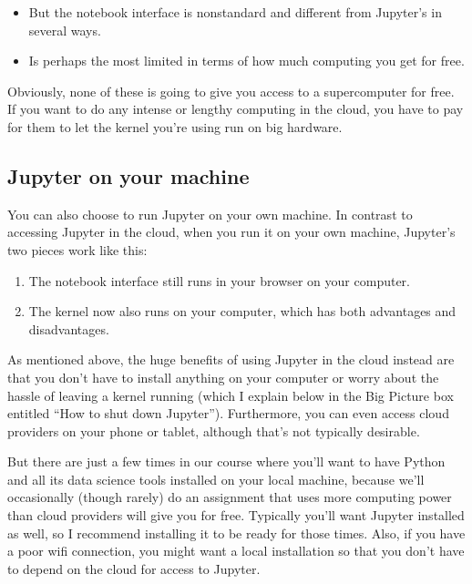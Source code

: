 \documentclass[letterpaper,10pt,english]{jupyterBook}
\begin{document}
\begin{enumerate}
\begin{itemize}
\item {} 
\sphinxAtStartPar
But the notebook interface is nonstandard and different from Jupyter’s in several ways.

\item {} 
\sphinxAtStartPar
Is perhaps the most limited in terms of how much computing you get for free.

\end{itemize}

\end{enumerate}

\sphinxAtStartPar
Obviously, none of these is going to give you access to a supercomputer for free.  If you want to do any intense or lengthy computing in the cloud, you have to pay for them to let the kernel you’re using run on big hardware.


\subsection{Jupyter on your machine}
\label{\detokenize{chapter-3-jupyter:jupyter-on-your-machine}}
\sphinxAtStartPar
You can also choose to run Jupyter on your own machine.  In contrast to accessing Jupyter in the cloud, when you run it on your own machine, Jupyter’s two pieces work like this:
\begin{enumerate}
%
\item {} 
\sphinxAtStartPar
The notebook interface still runs in your browser on your computer.

\item {} 
\sphinxAtStartPar
The kernel now also runs on your computer, which has both advantages and disadvantages.

\end{enumerate}

\sphinxAtStartPar
As mentioned above, the huge benefits of using Jupyter in the cloud instead are that you don’t have to install anything on your computer or worry about the hassle of leaving a kernel running (which I explain below in the Big Picture box entitled “How to shut down Jupyter”).  Furthermore, you can even access cloud providers on your phone or tablet, although that’s not typically desirable.

\sphinxAtStartPar
But there are just a few times in our course where you’ll want to have Python and all its data science tools installed on your local machine, because we’ll occasionally (though rarely) do an assignment that uses more computing power than cloud providers will give you for free.  Typically you’ll want Jupyter installed as well, so I recommend installing it to be ready for those times.  Also, if you have a poor wifi connection, you might want a local installation so that you don’t have to depend on the cloud for access to Jupyter.
\end{document}
